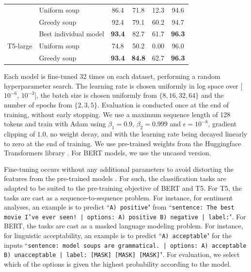 \documentclass[nohyperref]{article}
\theoremstyle{plain}
\theoremstyle{definition}
\theoremstyle{remark}
\begin{document}
\begin{table}
\begin{center}
\begin{tabular}{llcccc}
                &  Uniform soup & 86.4 & 71.8 & 12.3 & 94.6 \\
                &  Greedy soup & 92.4 & 79.1 & 60.2 & 94.7 \\\midrule
                \multirow{3}{*}{T5-large \cite{raffel2020t5}} & Best individual model & \textbf{93.4} & 82.7 & 61.7 & \textbf{96.3} \\
                &  Uniform soup & 74.8 & 50.2 & 0.00 & 96.0 \\
                &  Greedy soup & \textbf{93.4} & \textbf{84.8} & 62.7 & \textbf{96.3} \\
                \bottomrule
            \end{tabular}
            \end{center}
            \label{tab:nlp_full}
        \end{table}
    
    
    Each model is fine-tuned 32 times on each dataset, performing a random hyperparameter search. The learning rate is chosen uniformly in log space over [$10^{-6}$, $10^{-3}$], the batch size is chosen uniformly from $\{8, 16, 32, 64\}$ and the number of epochs from $\{2,3,5\}$. Evaluation is conducted once at the end of training, without early stopping. We use a maximum sequence length of 128 tokens and train with Adam \cite{kingma2014adam} using $\beta_1=0.9$, $\beta_2=0.999$ and $\epsilon=10^{-8}$, gradient clipping of $1.0$, no weight decay, and with the learning rate being decayed linearly to zero at the end of training. We use pre-trained weights from the Huggingface Transformers library \cite{wolf2020transformers}. For BERT models, we use the uncased version. 
    
    Fine-tuning occurs without any additional parameters to avoid distorting the features from the pre-trained models \cite{kumar2021finetuning}. For such, the classification tasks are adapted to be suited to the pre-training objective of BERT and T5. For T5, the tasks are cast as a sequence-to-sequence problem. For instance, for sentiment analyses, an example is to predict ``\texttt{A) positive}" from ``\texttt{sentence: The best movie I've ever seen! | options: A) positive B) negative | label:}". For BERT, the tasks are cast as a masked language modeling problem. For instance, for linguistic acceptability, an example is to predict ``\texttt{A) acceptable}" for the inputs ``\texttt{sentence: model soups are grammatical. | options: A) acceptable B) unacceptable | label: [MASK] [MASK] [MASK]}". For evaluation, we select which of the options is given the highest probability according to the model.
    
\end{document}
